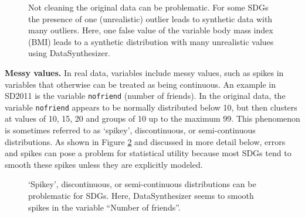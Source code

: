 \documentclass[runningheads]{llncs}
\begin{document}
\begin{figure}[t]
    \centering        
    
    \caption{Not cleaning the original data can be problematic. For some SDGs the presence of one (unrealistic) outlier leads to synthetic data with many outliers. Here, one false value of the variable body mass index (BMI) leads to a synthetic distribution with many unrealistic values using DataSynthesizer.}\label{fig:graph_datasynthesizer_bmi}
    \vspace{-2em}
\end{figure}

{\bf Messy values.} In real data, variables include messy values, such as spikes in variables that otherwise can be treated as being continuous.  An example in SD2011 is the variable \texttt{nofriend} (number of friends).  In the original data, the variable \texttt{nofriend} appears to be normally distributed below 10, but then clusters at values of 10, 15, 20 and groups of 10 up to the maximum 99.  This phenomenon is sometimes referred to as `spikey', discontinuous, or semi-continuous distributions.  As shown in Figure \ref{fig:graph_datasynthesizer_nofriend} and discussed in more detail below, errors and spikes can pose a problem for statistical utility because most SDGs tend to smooth these spikes unless they are explicitly modeled.

\begin{figure}[t]
    \centering        
    
    \caption{`Spikey', discontinuous, or semi-continuous distributions can be problematic for SDGs. Here, DataSynthesizer seems to smooth spikes in the variable ``Number of friends''.}
    \label{fig:graph_datasynthesizer_nofriend}
    \vspace{-2em}
\end{figure}
\end{document}
